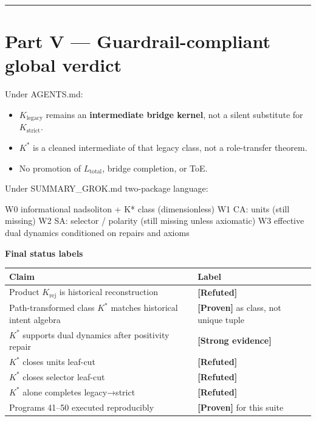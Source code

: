 \documentclass[11pt,a4paper,openany]{report}
\newcommand{\statusProven}{\textcolor{fingreen}{[Proven]}}
\newcommand{\statusStrong}{\textcolor{finblue}{[Strong evidence]}}
\newcommand{\statusRefuted}{\textcolor{finred}{[Refuted]}}
\begin{document}
\par\medskip\hrule\medskip

\chapter{Part V — Guardrail-compliant global verdict}

Under AGENTS.md:

\begin{itemize}
\item 
\(K_{\mathrm{legacy}}\) remains an \textbf{intermediate bridge kernel}, not a silent substitute for \(K_{\mathrm{strict}}\).

\item 
\(K^*\) is a cleaned intermediate of that legacy class, not a role-transfer theorem.

\item 
No promotion of \(L_{\mathrm{total}}\), bridge completion, or ToE.

\end{itemize}

Under SUMMARY\_GROK.md two-package language:

W0  informational nadsoliton + K* class (dimensionless) W1  CA: units (still missing) W2  SA: selector /\allowbreak{} polarity (still missing unless axiomatic) W3  effective dual dynamics conditioned on repairs and axioms

\textbf{Final status labels}

\begin{center}
\begingroup\small
\setlength{\tabcolsep}{3.5pt}
\renewcommand{\arraystretch}{1.16}
\begin{longtable}{@{}p{}p{}@{}}
\toprule
\textbf{Claim} & \textbf{Label} \\
\midrule
\endhead
Product \(K_{\mathrm{rej}}\) is historical reconstruction & \textbf{\statusRefuted{}} \\
Path-transformed class \(K^*\) matches historical intent algebra & \textbf{\statusProven{}} as class, not unique tuple \\
\(K^*\) supports dual dynamics after positivity repair & \textbf{\statusStrong{}} \\
\(K^*\) closes units leaf-cut & \textbf{\statusRefuted{}} \\
\(K^*\) closes selector leaf-cut & \textbf{\statusRefuted{}} \\
\(K^*\) alone completes legacy→strict & \textbf{\statusRefuted{}} \\
Programs 41–50 executed reproducibly & \textbf{\statusProven{}} for this suite \\
\bottomrule
\end{longtable}
\endgroup
\end{center}
\end{document}
